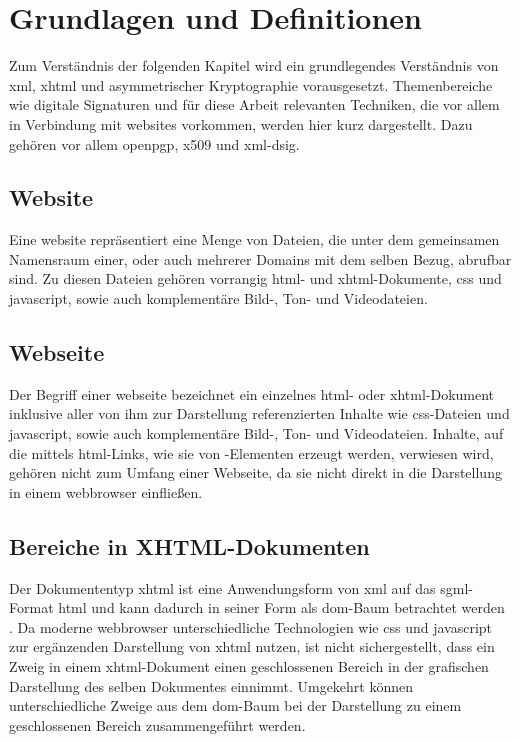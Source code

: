 
\chapter{Grundlagen und Definitionen}
\label{chap:GrundlagenDefinitionen}

Zum Verständnis der folgenden Kapitel wird ein grundlegendes Verständnis von \gls{xml}, \gls{xhtml} und asymmetrischer Kryptographie vorausgesetzt.
Themenbereiche wie digitale Signaturen und für diese Arbeit relevanten Techniken, die vor allem in Verbindung mit \glspl{website} vorkommen, werden hier kurz
dargestellt. Dazu gehören vor allem \gls{openpgp}, \gls{x509} und \gls{xml-dsig}.

\section{Website}
\label{sec:GrundlagenDefinitionen:Website}
Eine \gls{website} repräsentiert eine Menge von Dateien, die unter dem gemeinsamen Namensraum einer, oder auch mehrerer Domains mit dem selben Bezug, abrufbar sind.
Zu diesen Dateien gehören vorrangig \gls{html}- und \gls{xhtml}-Dokumente, \gls{css} und \gls{javascript}, sowie auch komplementäre Bild-, Ton- und
Videodateien.

\section{Webseite}
\label{sec:GrundlagenDefinitionen:Webseiten}
Der Begriff einer \gls{webseite} bezeichnet ein einzelnes \gls{html}- oder \gls{xhtml}-Dokument inklusive aller von ihm zur Darstellung referenzierten
Inhalte wie \gls{css}-Dateien und \gls{javascript}, sowie auch komplementäre Bild-, Ton- und Videodateien. Inhalte, auf die mittels \gls{html}-Links, wie sie
von -Elementen erzeugt werden, verwiesen wird, gehören nicht zum Umfang einer Webseite, da sie nicht direkt in die Darstellung in einem
\gls{webbrowser} einfließen.

\section{Bereiche in XHTML-Dokumenten}
\label{sec:GrundlagenDefinitionen:BereicheXHTML}
Der Dokumententyp \gls{xhtml} ist eine Anwendungsform von \gls{xml} auf das \gls{sgml}-Format \gls{html}\cite{xhtml:w3c} und kann dadurch in seiner Form als
\gls{dom}-Baum betrachtet werden \cite{xhtml:oreilly}. Da moderne \Gls{webbrowser} unterschiedliche Technologien wie \gls{css} und \gls{javascript} zur
ergänzenden Darstellung von \gls{xhtml} nutzen, ist nicht sichergestellt, dass ein Zweig in einem \gls{xhtml}-Dokument einen geschlossenen Bereich in der
grafischen Darstellung des selben Dokumentes einnimmt. Umgekehrt können unterschiedliche Zweige aus dem \gls{dom}-Baum bei der Darstellung zu einem
geschlossenen Bereich zusammengeführt werden.

